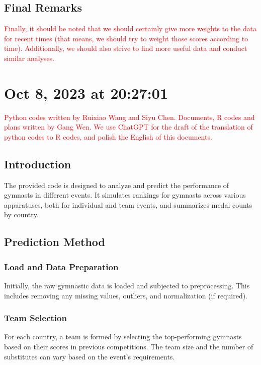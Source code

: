 \documentclass[11pt]{article}
\begin{document}
    \subsection{Final Remarks}
    \textcolor{red}{Finally, it should be noted that we should certainly give more weights to the data for recent times (that means, we should try to weight those scores according to time). Additionally, we should also strive to find more useful data and conduct similar analyses.}
    \section{Oct 8, 2023 at 20:27:01}
    \textcolor{red}{Python codes written by Ruixiao Wang and Siyu Chen. Documents, R codes and plans written by Gang Wen. We use ChatGPT for the draft of the translation of python codes to R codes, and polish the English of this documents.}
\subsection{Introduction}
The provided code is designed to analyze and predict the performance of gymnasts in different events. It simulates rankings for gymnasts across various apparatuses, both for individual and team events, and summarizes medal counts by country.

\subsection{Prediction Method}

\subsubsection{Load and Data Preparation}
Initially, the raw gymnastic data is loaded and subjected to preprocessing. This includes removing any missing values, outliers, and normalization (if required).

\subsubsection{Team Selection}
For each country, a team is formed by selecting the top-performing gymnasts based on their scores in previous competitions. The team size and the number of substitutes can vary based on the event's requirements.
\end{document}

